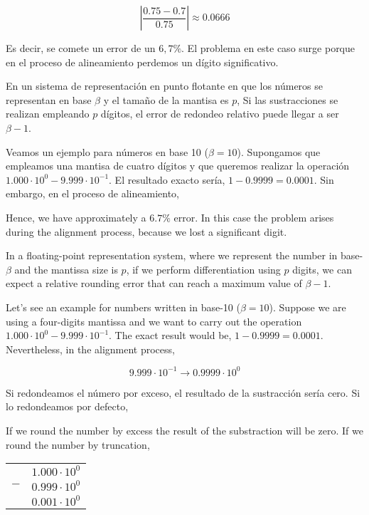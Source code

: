 \begin{equation*}
\left\vert\frac{0.75-0.7}{0.75}\right\vert\approx 0.0666
\end{equation*}
\begin{paracol}{2}
Es decir, se comete un error de un $6,7\%$. El problema en este caso surge porque en el proceso de alineamiento perdemos un dígito significativo.

 En un sistema de representación en punto flotante en que los números se representan en base $\beta$ y el tamaño de la mantisa es $p$, Si las sustracciones se realizan empleando $p$ dígitos, el error de redondeo relativo puede llegar a ser $\beta-1$.
 
Veamos un ejemplo para números en base 10 ($\beta=10$). Supongamos que empleamos una mantisa de cuatro dígitos y que queremos realizar la operación $1.000\cdot10^0-9.999\cdot10^{-1}$. El resultado exacto sería, $1-0.9999=0.0001$. Sin embargo, en el proceso de alineamiento,

\switchcolumn
Hence, we have approximately a $6.7\%$ error. In this case the problem arises during the alignment process, because we lost a significant digit.

In a floating-point representation system, where we represent the number in base-$\beta$ and the mantissa size is $p$, if we perform differentiation using $p$ digits, we can expect a relative rounding error that can reach a maximum value of $\beta-1$.

Let's see an example for numbers written in base-10 ($\beta=10$). Suppose we are using a four-digits mantissa and we want to carry out the operation $1.000\cdot10^0-9.999\cdot10^{-1}$. The exact result would be, $1-0.9999=0.0001$. Nevertheless, in the alignment process,
\end{paracol}

\begin{equation*}
9.999\cdot10^{-1}\rightarrow0.9999\cdot10^0
\end{equation*} 
\begin{paracol}{2}
Si redondeamos el número por exceso, el resultado de la sustracción sería cero. Si lo redondeamos por defecto,

\switchcolumn
If we round the number by excess the result of the substraction will be zero. If we round the number by truncation, 
\end{paracol}
\begin{minipage}{\textwidth}
	\centering
\begin{tabular}{c r}
&$1.000\cdot10^0$\\
$-$&$0.999\cdot10^0$\\
\hline
&$0.001\cdot10^0$
\end{tabular}\\
\end{minipage}

